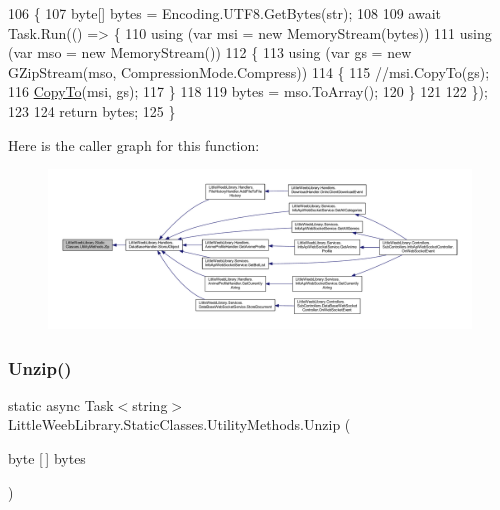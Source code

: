\begin{DoxyCode}
106         \{
107             byte[] bytes = Encoding.UTF8.GetBytes(str);
108 
109             await Task.Run(() => \{
110                 \textcolor{keyword}{using} (var msi = \textcolor{keyword}{new} MemoryStream(bytes))
111                 \textcolor{keyword}{using} (var mso = \textcolor{keyword}{new} MemoryStream())
112                 \{
113                     \textcolor{keyword}{using} (var gs = \textcolor{keyword}{new} GZipStream(mso, CompressionMode.Compress))
114                     \{
115                         \textcolor{comment}{//msi.CopyTo(gs);}
116                         \mbox{\hyperlink{class_little_weeb_library_1_1_static_classes_1_1_utility_methods_a4a514b7e55cf2285f4f16d778164695d}{CopyTo}}(msi, gs);
117                     \}
118 
119                     bytes = mso.ToArray();
120                 \}
121 
122             \});
123           
124             \textcolor{keywordflow}{return} bytes;
125         \}
\end{DoxyCode}
Here is the caller graph for this function\+:\nopagebreak
\begin{figure}[H]
\begin{center}
\leavevmode
\includegraphics[width=350pt]{class_little_weeb_library_1_1_static_classes_1_1_utility_methods_a16933213071d531063b29979e7b55fe8_icgraph}
\end{center}
\end{figure}
\mbox{\label{class_little_weeb_library_1_1_static_classes_1_1_utility_methods_a0a86ee01a3bf201bd9cc9b2552e54976}} 
\subsubsection{\texorpdfstring{Unzip()}{Unzip()}}
{\footnotesize\ttfamily static async Task$<$string$>$ Little\+Weeb\+Library.\+Static\+Classes.\+Utility\+Methods.\+Unzip (\begin{DoxyParamCaption}\item[{byte \mbox{[}$\,$\mbox{]}}]{bytes }\end{DoxyParamCaption})\hspace{0.3cm}{\ttfamily [static]}}



